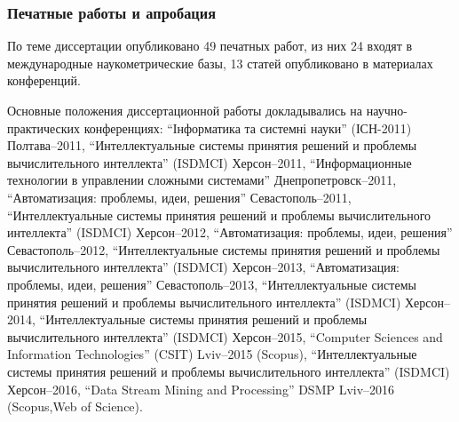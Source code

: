\documentclass[10pt,utf8]{beamer}
\begin{document}
\begin{frame}
  \frametitle{Печатные работы и апробация}

По теме диссертации опубликовано
49 печатных работ,
из них
24 входят в международные наукометрические базы,
13 статей опубликовано в материалах конференций.

{\scriptsize
Основные положения диссертационной работы докладывались на
научно-практических конференциях:
``Інформатика та системні науки'' (ІСН-2011) Полтава--2011,
``Интеллектуальные системы принятия решений и проблемы вычислительного интеллекта'' (ISDMCI) Херсон--2011,
``Информационные технологии в управлении сложными системами'' Днепропетровск--2011,
``Автоматизация: проблемы, идеи, решения'' Севастополь--2011,
``Интеллектуальные системы принятия решений и проблемы вычислительного интеллекта'' (ISDMCI) Херсон--2012,
``Автоматизация: проблемы, идеи, решения'' Севастополь--2012,
``Интеллектуальные системы принятия решений и проблемы вычислительного интеллекта'' (ISDMCI) Херсон--2013,
``Автоматизация: проблемы, идеи, решения'' Севастополь--2013,
``Интеллектуальные системы принятия решений и проблемы вычислительного интеллекта'' (ISDMCI) Херсон--2014,
``Интеллектуальные системы принятия решений и проблемы вычислительного интеллекта'' (ISDMCI) Херсон--2015,
``Computer Sciences and Information Technologies'' (CSIT) Lviv--2015 (Scopus),
``Интеллектуальные системы принятия решений и проблемы вычислительного интеллекта'' (ISDMCI) Херсон--2016,
``Data Stream Mining and Processing'' DSMP Lviv--2016 (Scopus,Web of Science).
}

\end{frame}




\end{document}
